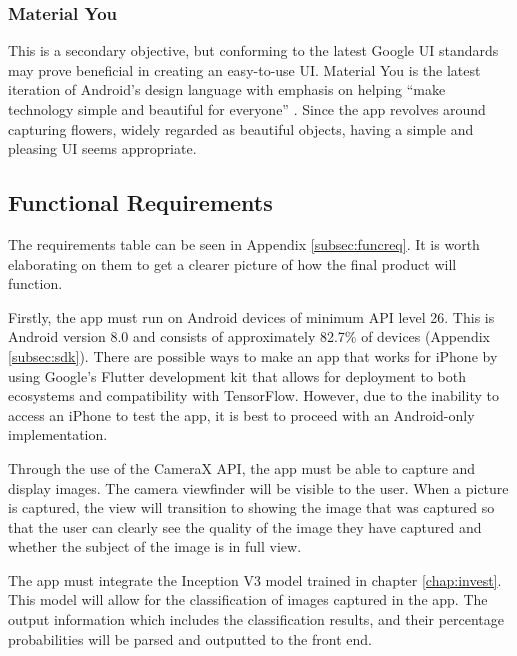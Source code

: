 \documentclass[12pt,a4paper]{report}
\begin{document}
\subsubsection{Material You}

This is a secondary objective, but conforming to the latest Google UI standards may prove beneficial in creating 
an easy-to-use UI. Material You is the latest iteration of Android's design language with emphasis on helping “make 
technology simple and beautiful for everyone” \citep{material}. Since the app revolves around capturing flowers, widely 
regarded as beautiful objects, having a simple and pleasing UI seems appropriate. 

\subsection{Functional Requirements}

The requirements table can be seen in Appendix \ref{subsec:funcreq}. It is worth elaborating on them to get a clearer 
picture of how the final product will function. 

\par

Firstly, the app must run on Android devices of minimum API level 26. This is Android version 8.0 and 
consists of approximately 82.7\% of devices (Appendix \ref{subsec:sdk}). 
There are possible ways to make an app that works for iPhone by using Google's Flutter development kit that allows 
for deployment to both ecosystems and compatibility with TensorFlow. However, due to the inability to access an iPhone 
to test the app, it is best to proceed with an Android-only implementation.

\par

Through the use of the CameraX API, the app must be able to capture and display images. The camera viewfinder will be 
visible to the user. When a picture is captured, the view will transition to showing the image that was captured so 
that the user can clearly see the quality of the image they have captured and whether the subject of the image is in 
full view.

\par

The app must integrate the Inception V3 model trained in chapter \ref{chap:invest}. 
This model will allow for the classification of 
images captured in the app. The output information which includes the classification results, and their percentage 
probabilities will be parsed and outputted to the front end.
\end{document}
